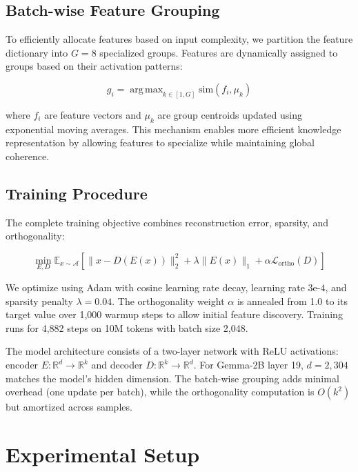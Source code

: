 \documentclass{article} %
\DeclareMathOperator*{\argmax}{arg\,max}
\begin{document}
\subsection{Batch-wise Feature Grouping}
To efficiently allocate features based on input complexity, we partition the feature dictionary into $G=8$ specialized groups. Features are dynamically assigned to groups based on their activation patterns:

\begin{equation}
g_i = \argmax_{k \in [1,G]} \text{sim}(f_i, \mu_k)
\label{eq:group_assign}
\end{equation}

where $f_i$ are feature vectors and $\mu_k$ are group centroids updated using exponential moving averages. This mechanism enables more efficient knowledge representation by allowing features to specialize while maintaining global coherence.

\subsection{Training Procedure}
The complete training objective combines reconstruction error, sparsity, and orthogonality:

\begin{equation}
\min_{E,D} \mathbb{E}_{x \sim \mathcal{A}} \left[ \|x - D(E(x))\|_2^2 + \lambda \|E(x)\|_1 + \alpha \mathcal{L}_{\text{ortho}}(D) \right]
\label{eq:full_loss}
\end{equation}

We optimize using Adam with cosine learning rate decay, learning rate $3\text{e-}4$, and sparsity penalty $\lambda=0.04$. The orthogonality weight $\alpha$ is annealed from 1.0 to its target value over 1,000 warmup steps to allow initial feature discovery. Training runs for 4,882 steps on 10M tokens with batch size 2,048.

The model architecture consists of a two-layer network with ReLU activations: encoder $E: \mathbb{R}^d \rightarrow \mathbb{R}^k$ and decoder $D: \mathbb{R}^k \rightarrow \mathbb{R}^d$. For Gemma-2B layer 19, $d=2,304$ matches the model's hidden dimension. The batch-wise grouping adds minimal overhead (one update per batch), while the orthogonality computation is $O(k^2)$ but amortized across samples.

\section{Experimental Setup}
\label{sec:experimental}
\end{document}

